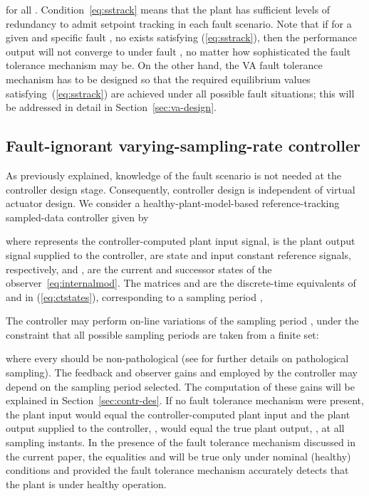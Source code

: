 \documentclass[letterpaper, 10 pt, conference]{ieeeconf}
\begin{document}
for all . Condition~\eqref{eq:sstrack} means
that the plant has sufficient levels of redundancy to admit setpoint
tracking in each fault scenario. 
Note that if for a given  and specific fault , no  exists satisfying (\ref{eq:sstrack}), then the performance output
will not converge to  under fault , no matter how
sophisticated the fault tolerance mechanism may be. On the other hand,
the VA fault tolerance mechanism has to be designed so that the
required equilibrium values satisfying~(\ref{eq:sstrack}) are achieved
under all possible fault situations; this will be addressed in detail
in Section~\ref{sec:va-design}.



\subsection{Fault-ignorant varying-sampling-rate controller}
\label{sec:fault-ign-contr}

As previously explained, knowledge of the fault scenario is not needed
at the controller design stage. Consequently, controller design is
independent of virtual actuator design. We consider a
healthy-plant-model-based reference-tracking sampled-data controller
given by

where  represents the controller-computed plant input signal,
 is the plant output signal supplied to the controller,
 are state and input constant reference signals,
respectively, and ,  are the current and successor
states of the observer~\eqref{eq:internalmod}.
The matrices  and  are the discrete-time
equivalents of  and  in (\ref{eq:ctstates}), corresponding to a sampling period ,

The controller may perform on-line variations of the sampling period
, under the constraint that all possible sampling periods are taken
from a finite set:

where every  should be non-pathological (see \cite{ChF95}
for further details on pathological sampling). The feedback and
observer gains  and  employed by the controller may depend
on the sampling period selected. The computation of these gains will
be explained in Section~\ref{sec:contr-des}. If no fault tolerance
mechanism were present, the plant input  would equal the
controller-computed plant input  and the plant output supplied to
the controller, , would equal the true plant output, , at all
sampling instants. In the presence of the fault tolerance mechanism
discussed in the current paper, the equalities  and 
will be true only under nominal (healthy) conditions and provided the
fault tolerance mechanism accurately detects that the plant is under
healthy operation. 
\end{document}
